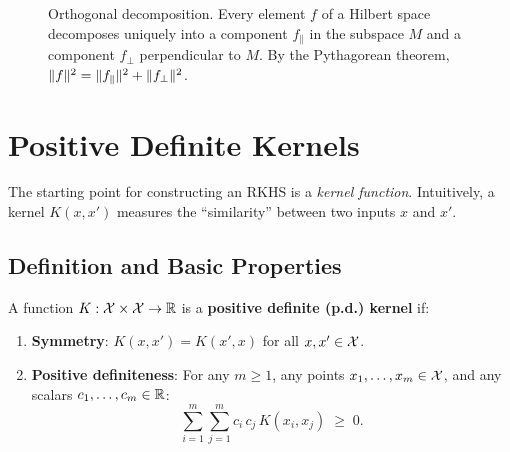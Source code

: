 \begin{notechapter}
\begin{figure}[ht]
\caption{Orthogonal decomposition. Every element $f$ of a Hilbert space
decomposes uniquely into a component $f_\parallel$ in the subspace $M$
and a component $f_\perp$ perpendicular to $M$. By the Pythagorean
theorem, $\| f \|^2 = \| f_\parallel \|^2 + \| f_\perp \|^2$.}
\label{rkhs:fig:ortho_decomp}
\end{figure}


\section{Positive Definite Kernels}
\label{rkhs:sec:kernels}

The starting point for constructing an RKHS is a \emph{kernel function}.
Intuitively, a kernel $K(x,x')$ measures the ``similarity'' between two
inputs $x$ and $x'$.

\subsection{Definition and Basic Properties}
\label{rkhs:subsec:kernel_def}

\begin{definitionbox}
\begin{definition}
\label{rkhs:def:pd_kernel}
A function $K: \mathcal{X} \times \mathcal{X} \to \mathbb{R}$ is a \textbf{positive definite
(p.d.) kernel} if:
\begin{enumerate}[label=(\roman*)]
  \item \textbf{Symmetry}: $K(x, x') = K(x', x)$ for all $x, x' \in \mathcal{X}$.
  \item \textbf{Positive definiteness}: For any $m \geq 1$, any points
  $x_1, \ldots, x_m \in \mathcal{X}$, and any scalars $c_1, \ldots, c_m \in \mathbb{R}$:
  \begin{equation}
  \label{rkhs:eq:pd_condition}
  \sum_{i=1}^m \sum_{j=1}^m c_i\, c_j\, K(x_i, x_j) \;\geq\; 0.
  \end{equation}
\end{enumerate}
\end{definition}
\end{definitionbox}


\end{notechapter}
